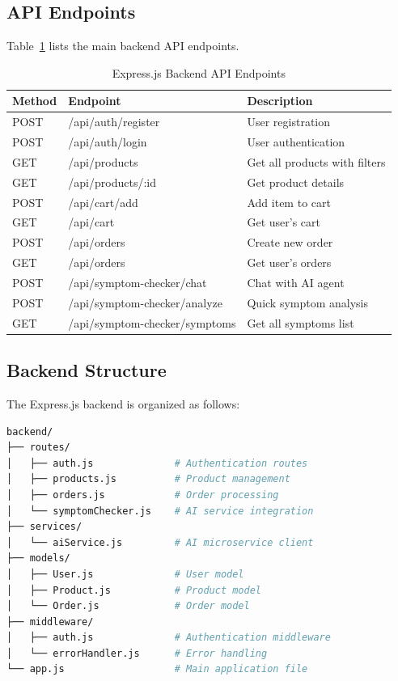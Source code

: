 \documentclass[12pt,a4paper]{article}
\begin{document}
\subsection{API Endpoints}
Table~\ref{tab:backendapi} lists the main backend API endpoints.

\begin{table}[H]
\centering
\caption{Express.js Backend API Endpoints}
\label{tab:backendapi}
\begin{tabularx}{\textwidth}{|l|l|X|}
\hline
\textbf{Method} & \textbf{Endpoint} & \textbf{Description} \\
\hline
POST & /api/auth/register & User registration \\
\hline
POST & /api/auth/login & User authentication \\
\hline
GET & /api/products & Get all products with filters \\
\hline
GET & /api/products/:id & Get product details \\
\hline
POST & /api/cart/add & Add item to cart \\
\hline
GET & /api/cart & Get user's cart \\
\hline
POST & /api/orders & Create new order \\
\hline
GET & /api/orders & Get user's orders \\
\hline
POST & /api/symptom-checker/chat & Chat with AI agent \\
\hline
POST & /api/symptom-checker/analyze & Quick symptom analysis \\
\hline
GET & /api/symptom-checker/symptoms & Get all symptoms list \\
\hline
\end{tabularx}
\end{table}

\subsection{Backend Structure}
The Express.js backend is organized as follows:

\begin{lstlisting}[language=bash, caption=Express.js Backend Structure]
backend/
├── routes/
│   ├── auth.js              # Authentication routes
│   ├── products.js          # Product management
│   ├── orders.js            # Order processing
│   └── symptomChecker.js    # AI service integration
├── services/
│   └── aiService.js         # AI microservice client
├── models/
│   ├── User.js              # User model
│   ├── Product.js           # Product model
│   └── Order.js             # Order model
├── middleware/
│   ├── auth.js              # Authentication middleware
│   └── errorHandler.js      # Error handling
└── app.js                   # Main application file
\end{lstlisting}
\end{document}
